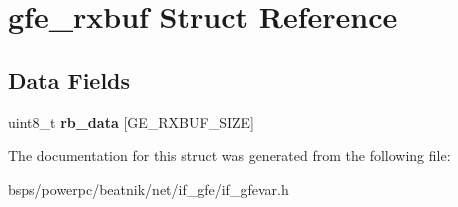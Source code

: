 \hypertarget{structgfe__rxbuf}{}\section{gfe\+\_\+rxbuf Struct Reference}
\label{structgfe__rxbuf}
\subsection*{Data Fields}
\begin{DoxyCompactItemize}
\item 
\mbox{\label{structgfe__rxbuf_aacc709fecab5b45cd1a42180a900797e}} 
uint8\+\_\+t {\bfseries rb\+\_\+data} \mbox{[}G\+E\+\_\+\+R\+X\+B\+U\+F\+\_\+\+S\+I\+ZE\mbox{]}
\end{DoxyCompactItemize}


The documentation for this struct was generated from the following file\+:\begin{DoxyCompactItemize}
\item 
bsps/powerpc/beatnik/net/if\+\_\+gfe/if\+\_\+gfevar.\+h\end{DoxyCompactItemize}
